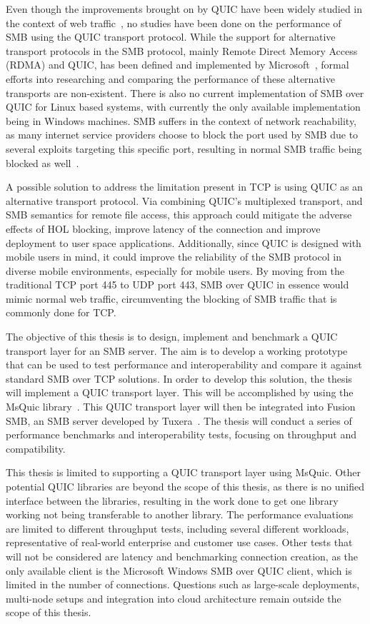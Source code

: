 \documentclass[english, 12pt, a4paper, elec, utf8, a-2b, online]{aaltothesis}
\begin{document}
Even though the improvements brought on by QUIC have been widely studied in the context
of web traffic~\cite{quic_better_for_what,evaluating_quic_perf,quic_and_tcp_performance},
no studies have been done on the performance of SMB using the QUIC transport protocol.
While the support for alternative transport protocols in the SMB protocol, mainly
Remote Direct Memory Access (RDMA) and QUIC, has been defined and implemented by Microsoft~\cite{smb2}, formal
efforts into researching and comparing the performance of these alternative transports
are non-existent. There is also no current implementation of SMB over QUIC for Linux
based systems, with currently the only available implementation being in Windows machines.
SMB suffers in the context of network reachability, as many internet service providers
choose to block the port used by SMB due to several exploits targeting this specific port,
resulting in normal SMB traffic being blocked as well~\cite{bitag_port_blocking}.

A possible solution to address the limitation present in TCP is using
QUIC as an alternative transport protocol. Via combining QUIC's multiplexed transport,
and SMB semantics for remote file access, this approach could mitigate the adverse effects of
HOL blocking, improve latency of the connection and improve deployment to user space
applications. Additionally, since QUIC is designed with mobile users in mind, it could
improve the reliability of the SMB protocol in diverse mobile environments, especially
for mobile users. By moving from the traditional TCP port 445 to UDP port 443,
SMB over QUIC in essence would mimic normal web traffic, circumventing the blocking
of SMB traffic that is commonly done for TCP.

The objective of this thesis is to design, implement and benchmark a QUIC transport
layer for an SMB server. The aim is to develop a working prototype that can be used to
test performance and interoperability and compare it against standard SMB over TCP solutions.
In order to develop this solution, the thesis will implement a QUIC transport layer. This
will be accomplished by using the MsQuic library~\cite{msquic}. This QUIC transport layer
will then be integrated into Fusion SMB, an SMB server developed by Tuxera~\cite{fusion}.
The thesis will conduct a series of performance benchmarks and interoperability tests,
focusing on throughput and compatibility.

This thesis is limited to supporting a QUIC transport layer using MsQuic. Other
potential QUIC libraries are beyond the scope of this thesis, as there is no
unified interface between the libraries, resulting in the work done to get one
library working not being transferable to another library. The performance evaluations
are limited to different throughput tests, including several different workloads, representative of
real-world enterprise and customer use cases.
Other tests that will not be considered are latency and benchmarking connection creation,
as the only available client is the Microsoft Windows SMB over QUIC client, which is
limited in the number of connections. Questions such as large-scale deployments,
multi-node setups and integration into cloud architecture remain outside the scope
of this thesis.
\end{document}
